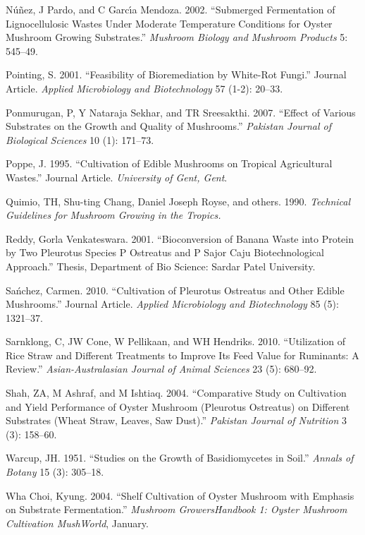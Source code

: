 \documentclass[]{article}
\begin{document}
\leavevmode\hypertarget{ref-nunez2002submerged}{}%
Núñez, J Pardo, and C Garcı́a Mendoza. 2002. ``Submerged Fermentation of Lignocellulosic Wastes Under Moderate Temperature Conditions for Oyster Mushroom Growing Substrates.'' \emph{Mushroom Biology and Mushroom Products} 5: 545--49.

\leavevmode\hypertarget{ref-pointing2001}{}%
Pointing, S. 2001. ``Feasibility of Bioremediation by White-Rot Fungi.'' Journal Article. \emph{Applied Microbiology and Biotechnology} 57 (1-2): 20--33.

\leavevmode\hypertarget{ref-ponmurugan2007effect}{}%
Ponmurugan, P, Y Nataraja Sekhar, and TR Sreesakthi. 2007. ``Effect of Various Substrates on the Growth and Quality of Mushrooms.'' \emph{Pakistan Journal of Biological Sciences} 10 (1): 171--73.

\leavevmode\hypertarget{ref-poppe1995}{}%
Poppe, J. 1995. ``Cultivation of Edible Mushrooms on Tropical Agricultural Wastes.'' Journal Article. \emph{University of Gent, Gent}.

\leavevmode\hypertarget{ref-quimio1990technical}{}%
Quimio, TH, Shu-ting Chang, Daniel Joseph Royse, and others. 1990. \emph{Technical Guidelines for Mushroom Growing in the Tropics.}

\leavevmode\hypertarget{ref-reddy2001bioconversion}{}%
Reddy, Gorla Venkateswara. 2001. ``Bioconversion of Banana Waste into Protein by Two Pleurotus Species P Ostreatus and P Sajor Caju Biotechnological Approach.'' Thesis, Department of Bio Science: Sardar Patel University.

\leavevmode\hypertarget{ref-sanchez2010cultivation}{}%
Sańchez, Carmen. 2010. ``Cultivation of Pleurotus Ostreatus and Other Edible Mushrooms.'' Journal Article. \emph{Applied Microbiology and Biotechnology} 85 (5): 1321--37.

\leavevmode\hypertarget{ref-sarnklong2010utilization}{}%
Sarnklong, C, JW Cone, W Pellikaan, and WH Hendriks. 2010. ``Utilization of Rice Straw and Different Treatments to Improve Its Feed Value for Ruminants: A Review.'' \emph{Asian-Australasian Journal of Animal Sciences} 23 (5): 680--92.

\leavevmode\hypertarget{ref-shah2004comparative}{}%
Shah, ZA, M Ashraf, and M Ishtiaq. 2004. ``Comparative Study on Cultivation and Yield Performance of Oyster Mushroom (Pleurotus Ostreatus) on Different Substrates (Wheat Straw, Leaves, Saw Dust).'' \emph{Pakistan Journal of Nutrition} 3 (3): 158--60.

\leavevmode\hypertarget{ref-warcup1951studies}{}%
Warcup, JH. 1951. ``Studies on the Growth of Basidiomycetes in Soil.'' \emph{Annals of Botany} 15 (3): 305--18.

\leavevmode\hypertarget{ref-kyung2004shelfcultivation}{}%
Wha Choi, Kyung. 2004. ``Shelf Cultivation of Oyster Mushroom with Emphasis on Substrate Fermentation.'' \emph{Mushroom GrowersH́andbook 1: Oyster Mushroom Cultivation MushWorld}, January.
\end{document}
